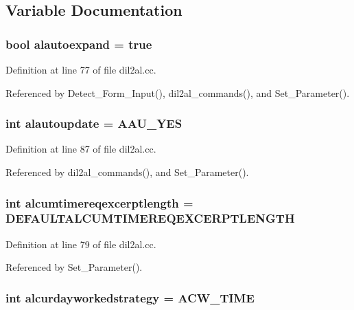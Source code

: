 \subsection{Variable Documentation}
\subsubsection{\setlength{\rightskip}{0pt plus 5cm}bool alautoexpand = {\bf true}}\label{dil2al_8cc_a59}




Definition at line 77 of file dil2al.cc.

Referenced by Detect\_\-Form\_\-Input(), dil2al\_\-commands(), and Set\_\-Parameter().
\subsubsection{\setlength{\rightskip}{0pt plus 5cm}int alautoupdate = AAU\_\-YES}\label{dil2al_8cc_a69}




Definition at line 87 of file dil2al.cc.

Referenced by dil2al\_\-commands(), and Set\_\-Parameter().
\subsubsection{\setlength{\rightskip}{0pt plus 5cm}int alcumtimereqexcerptlength = DEFAULTALCUMTIMEREQEXCERPTLENGTH}\label{dil2al_8cc_a61}




Definition at line 79 of file dil2al.cc.

Referenced by Set\_\-Parameter().
\subsubsection{\setlength{\rightskip}{0pt plus 5cm}int alcurdayworkedstrategy = ACW\_\-TIME}\label{dil2al_8cc_a67}




